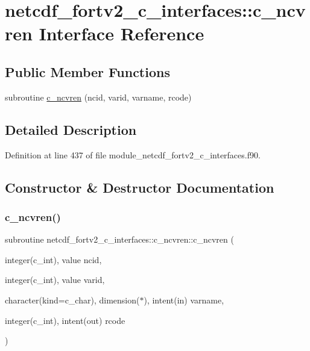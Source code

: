 \hypertarget{interfacenetcdf__fortv2__c__interfaces_1_1c__ncvren}{}\section{netcdf\+\_\+fortv2\+\_\+c\+\_\+interfaces\+:\+:c\+\_\+ncvren Interface Reference}
\label{interfacenetcdf__fortv2__c__interfaces_1_1c__ncvren}
\subsection*{Public Member Functions}
\begin{DoxyCompactItemize}
\item 
subroutine \hyperlink{interfacenetcdf__fortv2__c__interfaces_1_1c__ncvren_af7dd644acf00e91af3a14114bd9ffc08}{c\+\_\+ncvren} (ncid, varid, varname, rcode)
\end{DoxyCompactItemize}


\subsection{Detailed Description}


Definition at line 437 of file module\+\_\+netcdf\+\_\+fortv2\+\_\+c\+\_\+interfaces.\+f90.



\subsection{Constructor \& Destructor Documentation}
\mbox{\label{interfacenetcdf__fortv2__c__interfaces_1_1c__ncvren_af7dd644acf00e91af3a14114bd9ffc08}} 
\subsubsection{\texorpdfstring{c\+\_\+ncvren()}{c\_ncvren()}}
{\footnotesize\ttfamily subroutine netcdf\+\_\+fortv2\+\_\+c\+\_\+interfaces\+::c\+\_\+ncvren\+::c\+\_\+ncvren (\begin{DoxyParamCaption}\item[{integer(c\+\_\+int), value}]{ncid,  }\item[{integer(c\+\_\+int), value}]{varid,  }\item[{character(kind=c\+\_\+char), dimension($\ast$), intent(in)}]{varname,  }\item[{integer(c\+\_\+int), intent(out)}]{rcode }\end{DoxyParamCaption})}



